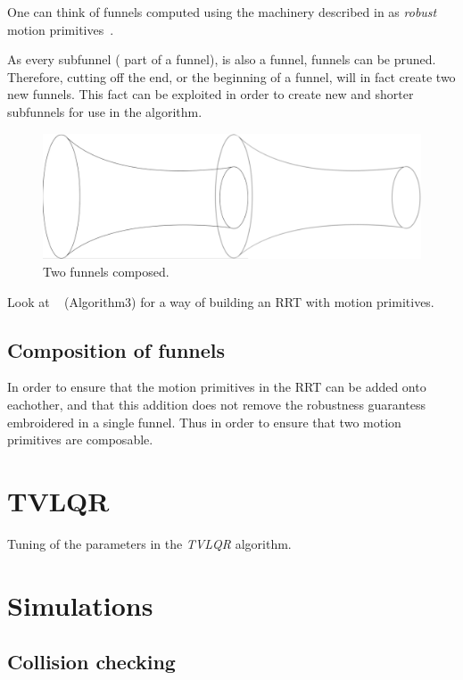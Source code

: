 One can think of funnels computed using the machinery described in
\cite[sec~4]{majumdarFunnelLibrariesRealtime2017} as \textit{robust} motion
primitives~\cite{majumdarFunnelLibrariesRealtime2017}.

As every subfunnel (\ie{} part of a funnel), is also a funnel, funnels can be
pruned. Therefore, cutting off the end, or the beginning of a funnel, will in
fact create two new funnels. This fact can be exploited in order to create new
and shorter subfunnels for use in the \rrtfunnel{} algorithm.

\begin{figure}
  \includegraphics[scale=.2]{figures/method/funnel-composition} \centering
  \caption{Two funnels composed.}
\end{figure}

Look at ~\cite{vonasekGlobalMotionPlanning2013} (Algorithm3) for a way of
building an RRT with motion primitives.

\subsection{Composition of funnels}

In order to ensure that the motion primitives in the \ac{RRT} can be added onto
eachother, and that this addition does not remove the robustness guarantess
embroidered in a single funnel. Thus in order to ensure that two motion
primitives are composable.

\section{TVLQR}

Tuning of the parameters in the \textit{TVLQR} algorithm.

\section{Simulations}

\subsection{Collision checking}

